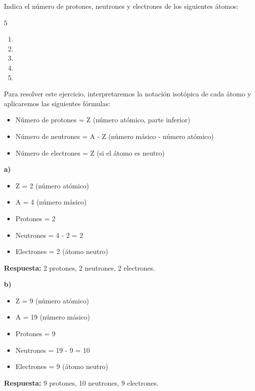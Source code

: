 \begin{exercise}
    Indica el número de protones, neutrones y electrones de los siguientes átomos:
    \begin{multicols}{5}
        \begin{enumerate}[label=\letraminuscula]
        \item {}
        \item {}
        \item {}
        \item {}
        \item {}
        \end{enumerate}
    \end{multicols}
    \begin{solu}
        Para resolver este ejercicio, interpretaremos la notación isotópica de cada átomo y aplicaremos las siguientes fórmulas:
        \begin{itemize}
            \item Número de protones = Z (número atómico, parte inferior)
            \item Número de neutrones = A - Z (número másico - número atómico)
            \item Número de electrones = Z (si el átomo es neutro)
        \end{itemize}

        \textbf{a) }
        \begin{itemize}
            \item Z = 2 (número atómico)
            \item A = 4 (número másico)
            \item Protones = 2
            \item Neutrones = 4 - 2 = 2
            \item Electrones = 2 (átomo neutro)
        \end{itemize}
        \textbf{Respuesta:} 2 protones, 2 neutrones, 2 electrones.

        \textbf{b) }
        \begin{itemize}
            \item Z = 9 (número atómico)
            \item A = 19 (número másico)
            \item Protones = 9
            \item Neutrones = 19 - 9 = 10
            \item Electrones = 9 (átomo neutro)
        \end{itemize}
        \textbf{Respuesta:} 9 protones, 10 neutrones, 9 electrones.


\end{solu}
\end{exercise}
